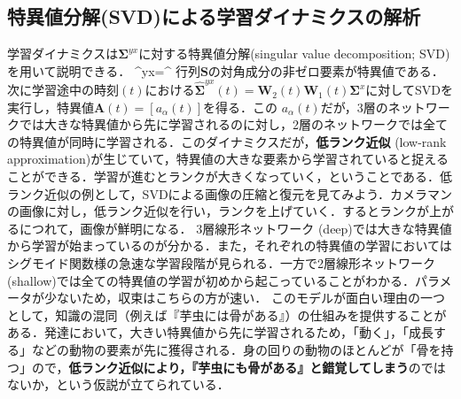 \subsection{特異値分解(SVD)による学習ダイナミクスの解析}
学習ダイナミクスは$ \mathbf{\Sigma}^{yx}$に対する特異値分解(singular value decomposition; SVD)を用いて説明できる．
\mathbf{\Sigma}^{yx}=^\top
行列$ \mathbf{ S}$の対角成分の非ゼロ要素が特異値である．次に学習途中の時刻$(t)$における$\hat{\mathbf{\Sigma}}^{yx}(t)=\mathbf{W}_2 (t) \mathbf{W}_1(t) \mathbf{\Sigma}^{x}$に対してSVDを実行し，特異値$\mathbf{A}(t)=[a_{\alpha}(t)]$を得る．この $a _ {\alpha}(t)$だが，3層のネットワークでは大きな特異値から先に学習されるのに対し，2層のネットワークでは全ての特異値が同時に学習される．このダイナミクスだが，\textbf{低ランク近似} (low-rank approximation)が生じていて，特異値の大きな要素から学習されていると捉えることができる．学習が進むとランクが大きくなっていく，ということである．低ランク近似の例として，SVDによる画像の圧縮と復元を見てみよう．カメラマンの画像に対し，低ランク近似を行い，ランクを上げていく．するとランクが上がるにつれて，画像が鮮明になる．
3層線形ネットワーク (deep)では大きな特異値から学習が始まっているのが分かる．また，それぞれの特異値の学習においてはシグモイド関数様の急速な学習段階が見られる．一方で2層線形ネットワーク (shallow)では全ての特異値の学習が初めから起こっていることがわかる．パラメータが少ないため，収束はこちらの方が速い．
このモデルが面白い理由の一つとして，知識の混同（例えば『芋虫には骨がある』）の仕組みを提供することがある．発達において，大きい特異値から先に学習されるため，「動く」，「成長する」などの動物の要素が先に獲得される．身の回りの動物のほとんどが「骨を持つ」ので，\textbf{低ランク近似により，『芋虫にも骨がある』と錯覚してしまう}のではないか，という仮説が立てられている．
